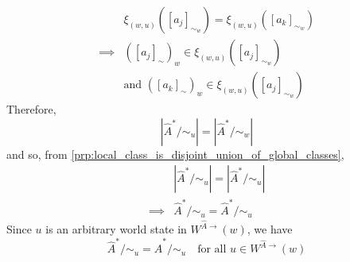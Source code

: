 \begin{proofE}
\begin{enumerate}
    \begin{align}
        & \xi_{(w, u)}([a_{j}]_{\sim_{w}}) = \xi_{(w, u)}([a_{k}]_{\sim_{w}}) \\
        \implies & ([a_{j}]_{\sim})_{w} \in \xi_{(w, u)}([a_{j}]_{\sim_{w}}) \\
             & \text{and } ([a_{k}]_{\sim})_{w} \in \xi_{(w, u)}([a_{j}]_{\sim_{w}})
    \end{align}
    Therefore,
    \begin{equation}
        |\hat{A}^{*}/\sim_{u}| = |\hat{A}^{*}/\sim_{w}|
    \end{equation}
    and so, from \cref{prp:local_class_is_disjoint_union_of_global_classes},
    \begin{align}
        & |\hat{A}^{*}/\sim_{u}| = |\hat{A}^{*}/\sim_{u}| \\
        \implies & \hat{A}^{*}/\sim_{u} = \hat{A}^{*}/\sim_{u}
    \end{align}
    Since $u$ is an arbitrary world state in $W^{\hat{A}\to}(w)$, we have
    \begin{equation}
        \hat{A}^{*}/\sim_{u} = \hat{A}^{*}/\sim_{u} \quad \text{for all $u \in W^{\hat{A}\to}(w)$}
    \end{equation}


\end{enumerate}
\end{proofE}
